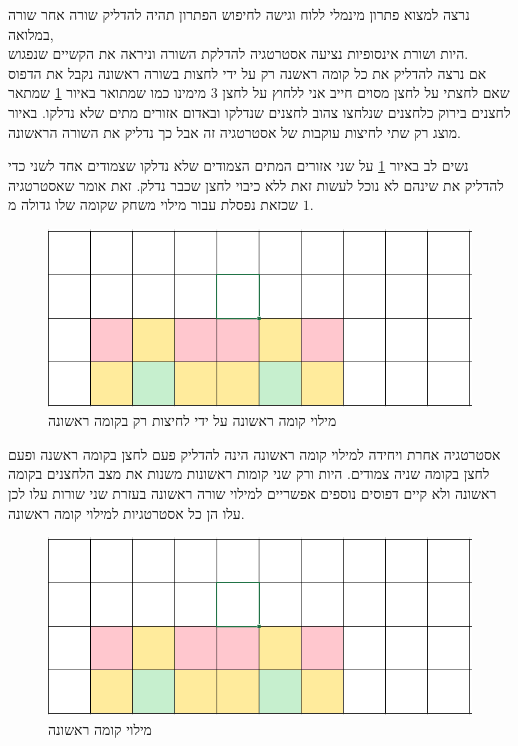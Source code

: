 \documentclass[12pt,twoside]{article}
\begin{document}
נרצה למצוא פתרון מינמלי ללוח
וגישה לחיפוש הפתרון תהיה
להדליק שורה אחר שורה במלואה,
\\
היות ושורת אינסופיות נציעה אסטרטגיה להדלקת השורה וניראה את הקשיים שנפגוש.
\\
אם נרצה להדליק 
את כל קומה ראשנה רק על ידי לחצות 
בשורה ראשונה נקבל את הדפוס 
שאם לחצתי על לחצן מסוים חייב אני ללחוץ על לחצן
$3$
מימינו
כמו שמתואר באיור
\ref{fig: fill first stage only pressing first stage}
שמתאר לחצנים בירוק כלחצנים שנלחצו 
צהוב לחצנים שנדלקו ובאדום אזורים מתים שלא נדלקו.
באיור מוצג רק שתי לחיצות עוקבות של אסטרטגיה זה אבל כך נדליק את השורה הראשונה.

נשים לב באיור 
\ref{fig: fill first stage only pressing first stage}
על שני אזורים המתים הצמודים שלא נדלקו שצמודים אחד לשני כדי להדליק את שינהם
לא נוכל לעשות זאת ללא כיבוי לחצן שכבר נדלק.
זאת אומר שאסטרטגיה שכזאת
נפסלת עבור מילוי משחק שקומה שלו גדולה מ
$1$.

\begin{figure}[ht]
    \caption{מילוי קומה ראשונה על ידי לחיצות רק בקומה ראשונה}
    \label{fig: fill first stage only pressing first stage}
    \centering
    \includegraphics[width=.7\textwidth,height=.7\textheight,keepaspectratio]{images/first_stage_fill_only_first_stage_click.PNG}
\end{figure}

אסטרטגיה אחרת ויחידה למילוי קומה ראשונה הינה להדליק 
פעם לחצן בקומה ראשנה 
ופעם לחצן בקומה שניה צמודים.
היות ורק שני קומות ראשונות משנות את מצב הלחצנים בקומה ראשונה ולא קיים דפוסים נוספים
אפשריים למילוי שורה ראשונה בעזרת שני שורות עלו לכן עלו הן כל אסטרטגיות למילוי קומה ראשונה.

\begin{figure}[ht]
    \caption{מילוי קומה ראשונה}
    \label{fig: fill first stage second attempt}
    \centering
    \includegraphics[width=.7\textwidth,height=.7\textheight,keepaspectratio]{images/first_stage_fill_only_first_stage_click.PNG}
\end{figure}
\end{document}
